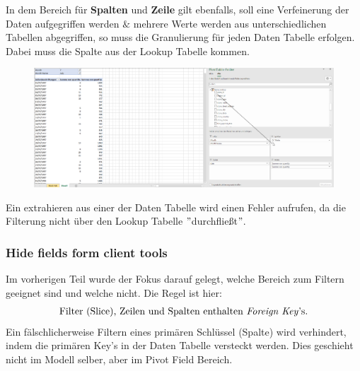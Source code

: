 In dem Bereich für \textbf{Spalten} und \textbf{Zeile} gilt ebenfalls, soll eine Verfeinerung der Daten aufgegriffen werden $\&$ mehrere Werte werden aus unterschiedlichen Tabellen abgegriffen, so muss die Granulierung für jeden Daten Tabelle erfolgen. Dabei muss die Spalte aus der Lookup Tabelle kommen. 
\begin{figure}[H]
	\centering
	\includegraphics[scale = 0.3]{attachment/chapter_1/screenshot065}
	\caption{}
	\label{fig:screenshot065}
\end{figure}
Ein extrahieren aus einer der Daten Tabelle wird einen Fehler aufrufen, da die Filterung nicht über den Lookup Tabelle $"$durchfließt$"$. 
\subsubsection{Hide fields form client tools}
Im vorherigen Teil wurde der Fokus darauf gelegt, welche Bereich zum Filtern geeignet sind und welche nicht. Die Regel ist hier:
\begin{align}
	\text{Filter (Slice), Zeilen und Spalten enthalten \textit{Foreign Key}'s.}
\end{align}
Ein fälschlicherweise Filtern eines primären Schlüssel (Spalte) wird verhindert, indem die primären Key's in der Daten Tabelle versteckt werden. Dies geschieht nicht im Modell selber, aber im Pivot Field Bereich.\\

